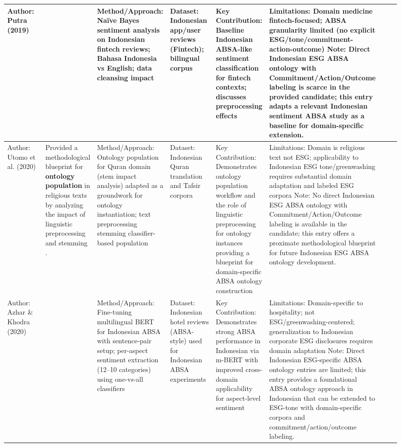 \documentclass{article}
\begin{document}
\begin{landscape}
\begin{longtable}{p{0.134\linewidth} p{0.134\linewidth} p{0.134\linewidth} p{0.134\linewidth} p{0.134\linewidth} p{0.134\linewidth} p{0.134\linewidth}}
Author: Putra (2019) & ~ & Method/Approach: Naïve Bayes sentiment analysis on Indonesian fintech reviews; Bahasa Indonesia vs English; data cleansing impact & Dataset: Indonesian app/user reviews (Fintech); bilingual corpus & Key Contribution: Baseline Indonesian ABSA-like sentiment classification for fintech contexts; discusses preprocessing effects & Limitations: Domain medicine fintech-focused; ABSA granularity limited (no explicit ESG/tone/commitment-action-outcome) Note: Direct Indonesian ESG ABSA ontology with Commitment/Action/Outcome labeling is scarce in the provided candidate; this entry adapts a relevant Indonesian sentiment ABSA study as a baseline for domain-specific extension. \\ \hline
Author: Utomo et al. (2020) & Provided a methodological blueprint for \textbf{ontology population} in religious texts by analyzing the impact of linguistic preprocessing and stemming  \parencite{fandy_setyo_utomo_e8f4e085}. & Method/Approach: Ontology population for Quran domain (stem impact analysis) adapted as a groundwork for ontology instantiation; text preprocessing stemming classifier-based population & Dataset: Indonesian Quran translation and Tafsir corpora & Key Contribution: Demonstrates ontology population workflow and the role of linguistic preprocessing for ontology instances providing a blueprint for domain-specific ABSA ontology construction & Limitations: Domain is religious text not ESG; applicability to Indonesian ESG tone/greenwashing requires substantial domain adaptation and labeled ESG corpora Note: No direct Indonesian ESG ABSA ontology with Commitment/Action/Outcome labeling is available in the candidate; this entry offers a proximate methodological blueprint for future Indonesian ESG ABSA ontology development. \\ \hline
Author: Azhar \& Khodra (2020) & ~ & Method/Approach: Fine-tuning multilingual BERT for Indonesian ABSA with sentence-pair setup; per-aspect sentiment extraction (12–10 categories) using one-vs-all classifiers & Dataset: Indonesian hotel reviews (ABSA-style) used for Indonesian ABSA experiments & Key Contribution: Demonstrates strong ABSA performance in Indonesian via m-BERT with improved cross-domain applicability for aspect-level sentiment & Limitations: Domain-specific to hospitality; not ESG/greenwashing-centered; generalization to Indonesian corporate ESG disclosures requires domain adaptation Note: Direct Indonesian ESG-specific ABSA ontology entries are limited; this entry provides a foundational ABSA ontology approach in Indonesian that can be extended to ESG-tone with domain-specific corpora and commitment/action/outcome labeling. \\ \hline

\end{longtable}
\end{landscape}
\end{document}
